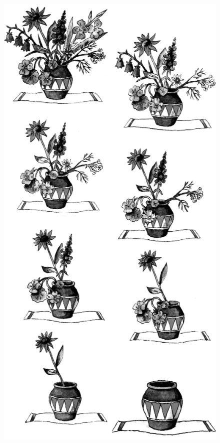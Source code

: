 \par

\begin{figure}[H]
\begin{minipage}{0.35\linewidth}
    \includegraphics[width=0.95\columnwidth]{img/gorshok.png}
\end{minipage}

\end{figure}
